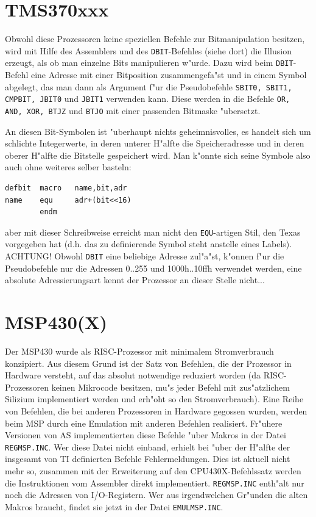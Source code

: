 \documentclass[12pt,a4paper,twoside]{report}
\newcommand{\tty}[1]{{\tt #1}}
\newcommand{\asname}{AS}
\begin{document}

\section{TMS370xxx}

Obwohl diese Prozessoren keine speziellen Befehle zur Bitmanipulation
besitzen, wird mit Hilfe des Assemblers und des \tty{DBIT}-Befehles
(siehe dort) die Illusion erzeugt, als ob man einzelne Bits manipulieren
w"urde.  Dazu wird beim \tty{DBIT}-Befehl eine Adresse mit einer
Bitposition zusammengefa"st und in einem Symbol abgelegt, das man dann
als Argument f"ur die Pseudobefehle \tty{SBIT0, SBIT1, CMPBIT, JBIT0}
und \tty{JBIT1} verwenden kann.  Diese werden in die Befehle
\tty{OR, AND, XOR, BTJZ} und \tty{BTJO} mit einer passenden Bitmaske
"ubersetzt.
\par
An diesen Bit-Symbolen ist "uberhaupt nichts geheimnisvolles, es handelt
sich um schlichte Integerwerte, in deren unterer H"alfte die
Speicheradresse und in deren oberer H"alfte die Bitstelle gespeichert
wird.  Man k"onnte sich seine Symbole also auch ohne weiteres selber
basteln:
\begin{verbatim}
defbit  macro   name,bit,adr
name    equ     adr+(bit<<16)
        endm
\end{verbatim}
aber mit dieser Schreibweise erreicht man nicht den \tty{EQU}-artigen Stil,
den Texas vorgegeben hat (d.h. das zu definierende Symbol steht anstelle
eines Labels).  ACHTUNG!  Obwohl \tty{DBIT} eine beliebige Adresse
zul"a"st, k"onnen f"ur die Pseudobefehle nur die Adressen 0..255 und
1000h..10ffh verwendet werden, eine absolute Adressierungsart kennt
der Prozessor an dieser Stelle nicht...


\section{MSP430(X)}
\label{MSPSpec}

Der MSP430 wurde als RISC-Prozessor mit minimalem Stromverbrauch
konzipiert.  Aus diesem Grund ist der Satz von Befehlen, die der
Prozessor in Hardware versteht, auf das absolut notwendige reduziert
worden (da RISC-Prozessoren keinen Mikrocode besitzen, mu"s jeder
Befehl mit zus"atzlichem Silizium implementiert werden und erh"oht so
den Stromverbrauch).  Eine Reihe von Befehlen, die bei anderen
Prozessoren in Hardware gegossen wurden, werden beim MSP durch eine
Emulation mit anderen Befehlen realisiert.  Fr"uhere Versionen
von \asname{} implementierten diese Befehle "uber Makros in der Datei
\tty{REGMSP.INC}.  Wer diese Datei nicht einband, erhielt bei "uber
der H"alfte der insgesamt von TI definierten Befehle
Fehlermeldungen.  Dies ist aktuell nicht mehr so, zusammen mit
der Erweiterung auf den CPU430X-Befehlssatz werden die
Instruktionen vom Assembler direkt implementiert.
\tty{REGMSP.INC} enth"alt nur noch die Adressen von I/O-Registern.
Wer aus irgendwelchen Gr"unden die alten Makros braucht, findet
sie jetzt in der Datei \tty{EMULMSP.INC}.
\end{document}
